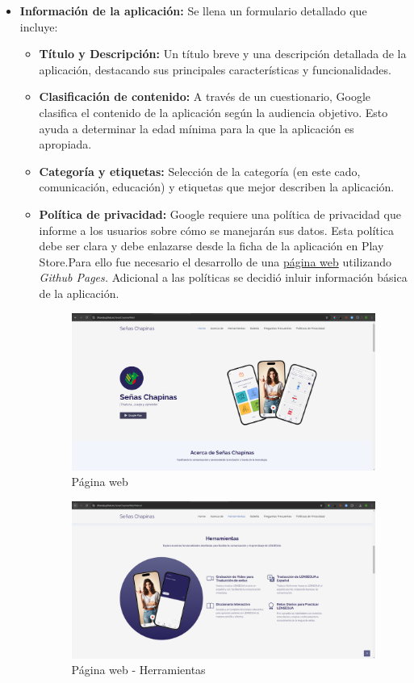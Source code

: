 \begin{itemize}
    \item \textbf{Información de la aplicación:} Se llena un formulario detallado que incluye:
    \begin{itemize}
        \item \textbf{Título y Descripción:} Un título breve y una descripción detallada de la aplicación, destacando sus principales características y funcionalidades.
        \item \textbf{Clasificación de contenido:} A través de un cuestionario, Google clasifica el contenido de la aplicación según la audiencia objetivo. Esto ayuda a determinar la edad mínima para la que la aplicación es apropiada.
        \item \textbf{Categoría y etiquetas:} Selección de la categoría (en este cado, comunicación, educación) y etiquetas que mejor describen la aplicación.
        \item \textbf{Política de privacidad:} Google requiere una política de privacidad que informe a los usuarios sobre cómo se manejarán sus datos. Esta política debe ser clara y debe enlazarse desde la ficha de la aplicación en Play Store.Para ello fue necesario el desarrollo de una \href{https://20candy.github.io/SenasChapinasWeb/}{página web} utilizando \textit{Github Pages.} Adicional a las políticas se decidió inluir información básica de la aplicación. 

        \begin{figure} [H]
            \centering
            \includegraphics[width=0.8\linewidth]{figuras/pagina_web.png}
            \caption{Página web}
            \label{fig:enter-label}
        \end{figure}

        \begin{figure}[H]
            \centering
            \includegraphics[width=0.8\linewidth]{figuras/pagina_web_herramientas.png}
            \caption{Página web - Herramientas}
            \label{fig:enter-label}
        \end{figure}


\end{itemize}
\end{itemize}
